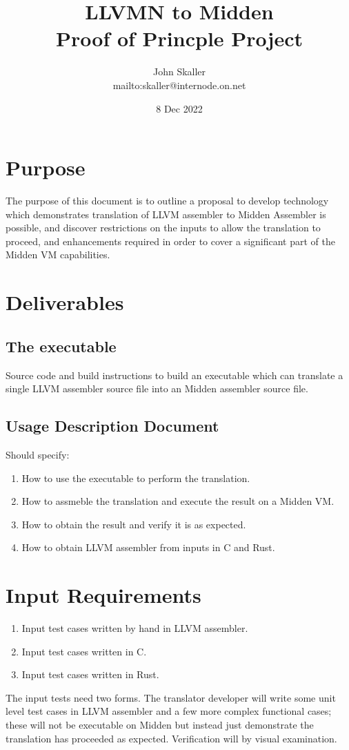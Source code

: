 \documentclass{article}
\title{LLVMN to Midden\\ Proof of Princple Project}
\author{John Skaller\\ mailto:skaller@internode.on.net}
\date{8 Dec 2022}
\begin{document}
\maketitle
\section{Purpose}
The purpose of this document is to outline a proposal to develop technology which
demonstrates translation of LLVM assembler to Midden Assembler is possible,
and discover restrictions on the inputs to allow the translation to proceed,
and enhancements required in order to cover a significant part of the Midden
VM capabilities.

\section{Deliverables}
\subsection{The executable}
Source code and build instructions to build an executable which can translate a
single LLVM assembler source file into an Midden assembler source file.

\subsection{Usage Description Document}
Should specify:
\begin{enumerate}
\item How to use the executable to perform the translation.
\item How to assmeble the translation and execute the result on a Midden VM.
\item How to obtain the result and verify it is as expected.
\item How to obtain LLVM assembler from inputs in C and Rust.
\end{enumerate}

\section{Input Requirements}
\begin{enumerate}
\item Input test cases written by hand in LLVM assembler.
\item Input test cases written in C.
\item Input test cases written in Rust.
\end{enumerate}
The input tests need two forms. The translator developer will write some unit level
test cases in LLVM assembler and a few more complex functional cases; these
will not be executable on Midden but instead just demonstrate the translation has proceeded
as expected. Verification will by visual examination.
\end{document}

